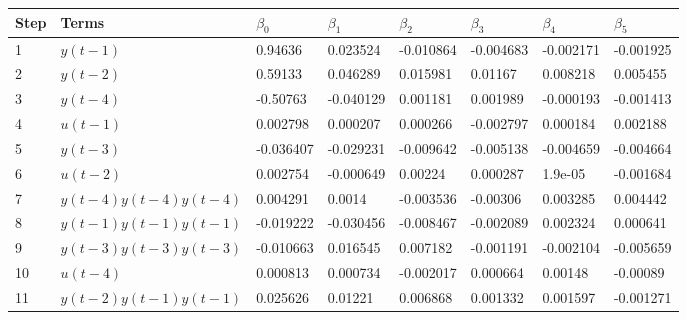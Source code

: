 \begin{tabular}{llllllll}
Step & Terms & $\beta_{0}$ & $\beta_{1}$ & $\beta_{2}$ & $\beta_{3}$ & $\beta_{4}$ & $\beta_{5}$ \\ 
\hline 
1 & $y(t-1)$ & 0.94636 & 0.023524 & -0.010864 & -0.004683 & -0.002171 & -0.001925 \\ 
2 & $y(t-2)$ & 0.59133 & 0.046289 & 0.015981 & 0.01167 & 0.008218 & 0.005455 \\ 
3 & $y(t-4)$ & -0.50763 & -0.040129 & 0.001181 & 0.001989 & -0.000193 & -0.001413 \\ 
4 & $u(t-1)$ & 0.002798 & 0.000207 & 0.000266 & -0.002797 & 0.000184 & 0.002188 \\ 
5 & $y(t-3)$ & -0.036407 & -0.029231 & -0.009642 & -0.005138 & -0.004659 & -0.004664 \\ 
6 & $u(t-2)$ & 0.002754 & -0.000649 & 0.00224 & 0.000287 & 1.9e-05 & -0.001684 \\ 
7 & $y(t-4)y(t-4)y(t-4)$ & 0.004291 & 0.0014 & -0.003536 & -0.00306 & 0.003285 & 0.004442 \\ 
8 & $y(t-1)y(t-1)y(t-1)$ & -0.019222 & -0.030456 & -0.008467 & -0.002089 & 0.002324 & 0.000641 \\ 
9 & $y(t-3)y(t-3)y(t-3)$ & -0.010663 & 0.016545 & 0.007182 & -0.001191 & -0.002104 & -0.005659 \\ 
10 & $u(t-4)$ & 0.000813 & 0.000734 & -0.002017 & 0.000664 & 0.00148 & -0.00089 \\ 
11 & $y(t-2)y(t-1)y(t-1)$ & 0.025626 & 0.01221 & 0.006868 & 0.001332 & 0.001597 & -0.001271 \\ 
\hline 
\end{tabular}